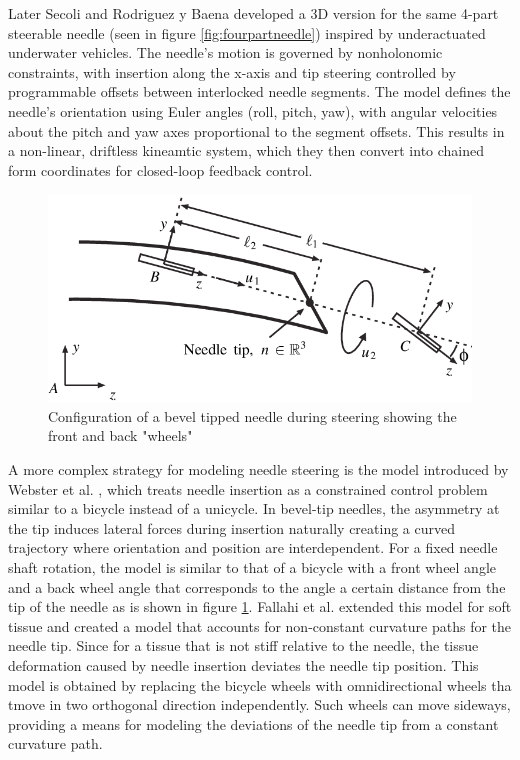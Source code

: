 Later Secoli and Rodriguez y Baena developed a 3D version for the same 4-part steerable needle (seen in figure \ref{fig:fourpartneedle}) inspired by underactuated underwater vehicles. The needle's motion is governed by nonholonomic constraints, with insertion along the x-axis and tip steering controlled by programmable offsets between interlocked needle segments. The model defines the needle's orientation using Euler angles (roll, pitch, yaw), with angular velocities about the pitch and yaw axes proportional to the segment offsets. This results in a non-linear, driftless kineamtic system, which they then convert into chained form coordinates for closed-loop feedback control.

\begin{figure}
    \centering
    \includegraphics[width=0.7\linewidth]{images/steerableNeedles/Configuration-of-a-bevel-tip-needle-during-steering-showing-the-front-and-back-wheels.png}
    \caption{Configuration of a bevel tipped needle during steering showing the front and back "wheels" \cite{webster_nonholonomic_2006}}
    \label{fig:bicycle}
\end{figure}
A more complex strategy for modeling needle steering is the  model introduced by Webster et al. \cite{webster_nonholonomic_2006}, which treats needle insertion as a constrained control problem similar to a bicycle instead of a unicycle. In bevel-tip needles, the asymmetry at the tip induces lateral forces during insertion naturally creating a curved trajectory where orientation and position are interdependent. For a fixed needle shaft rotation, the model is similar to that of a bicycle with a front wheel angle and a back wheel angle that corresponds to the angle a certain distance from the tip of the needle as is shown in figure \ref{fig:bicycle}.
\newline \newline
Fallahi et al. extended this model for soft tissue and created a model that accounts for non-constant curvature paths for the needle tip. Since for a tissue that is not stiff relative to the needle, the tissue deformation caused by needle insertion deviates the needle tip position. This model is obtained by replacing the bicycle wheels with omnidirectional wheels tha tmove in two orthogonal direction independently. Such wheels can move sideways, providing a means for modeling the deviations of the needle tip from a constant curvature path. \cite{fallahi_extended_2015}



